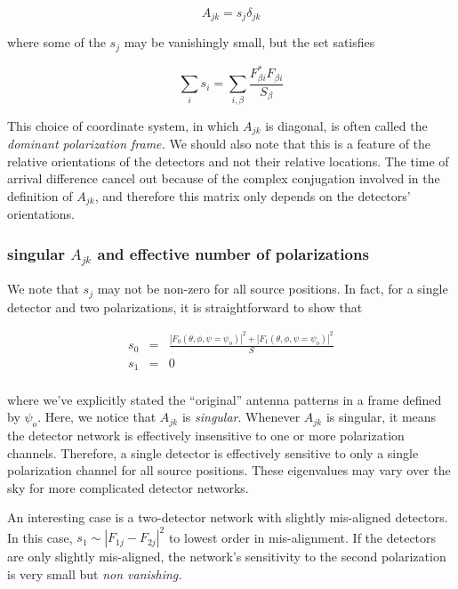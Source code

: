 \documentclass[10pt]{article}
\begin{document}
\begin{equation}
A_{jk} = s_{j} \delta_{jk}
\end{equation}

where some of the $s_{j}$ may be vanishingly small, but the set satisfies

\begin{equation}
\sum\limits_i s_i = \sum\limits_{i,\beta} \frac{F_{\beta i}^\ast F_{\beta i}}{S_\beta}
\end{equation}

This choice of coordinate system, in which $A_{jk}$ is diagonal, is often called the \emph{dominant polarization frame.} We should also note that this is a feature of the relative orientations of the detectors and not their relative locations. The time of arrival difference cancel out because of the complex conjugation involved in the definition of $A_{jk}$, and therefore this matrix only depends on the detectors' orientations.

\subsubsection{singular $A_{jk}$ and effective number of polarizations}

We note that $s_{j}$ may not be non-zero for all source positions. In fact, for a single detector and two polarizations, it is straightforward to show that

\begin{eqnarray}
s_{0} & = & \frac{\left|F_0(\theta,\phi,\psi=\psi_o)\right|^2 + \left|F_1(\theta,\phi,\psi=\psi_o)\right|^2}{S} \\
s_{1} & = & 0 \\
\end{eqnarray}

where we've explicitly stated the ``original'' antenna patterns in a frame defined by $\psi_o$. Here, we notice that $A_{jk}$ is \emph{singular}. Whenever $A_{jk}$ is singular, it means the detector network is effectively insensitive to one or more polarization channels. Therefore, a single detector is effectively sensitive to only a single polarization channel for all source positions. These eigenvalues may vary over the sky for more complicated detector networks. 

An interesting case is a two-detector network with slightly mis-aligned detectors. In this case, $s_1 \sim |F_{1j}-F_{2j}|^2$ to lowest order in mis-alignment. If the detectors are only slightly mis-aligned, the network's sensitivity to the second polarization is very small but \emph{non vanishing.}
\end{document}

